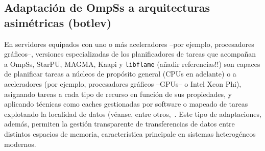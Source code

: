 

\subsection{Adaptación de OmpSs a arquitecturas asimétricas (botlev)}
\label{s3:botlev}

En servidores equipados con uno o más aceleradores --por ejemplo, procesadores gráficos--, versiones especializadas de los
planificadores de tareas que acompañan a OmpSs, StarPU, MAGMA, Kaapi y {\tt libflame} (añadir referencias!!) son capaces
de planificar tareas a núcleos de propósito general (CPUs en adelante) o a aceleradores (por ejemplo, procesadores gráficos
--GPUs-- o Intel Xeon Phi), asignando tareas a cada tipo de recurso en función de sus propiedades, y aplicando técnicas
como caches gestionadas por software o mapeado de tareas explotando la localidad de datos (véanse, entre 
otros,~\cite{Quintana:2008:PMA,CPE:CPE1463,Augonnet:2011:SUP:1951453.1951454,5470941,Gautier:2013:XRS:2510661.2511383}. Este
tipo de adaptaciones, además, permiten la gestión transparente de transferencias de datos entre distintos espacios de 
memoria, característica principale en sistemas heterogéneos modernos.


